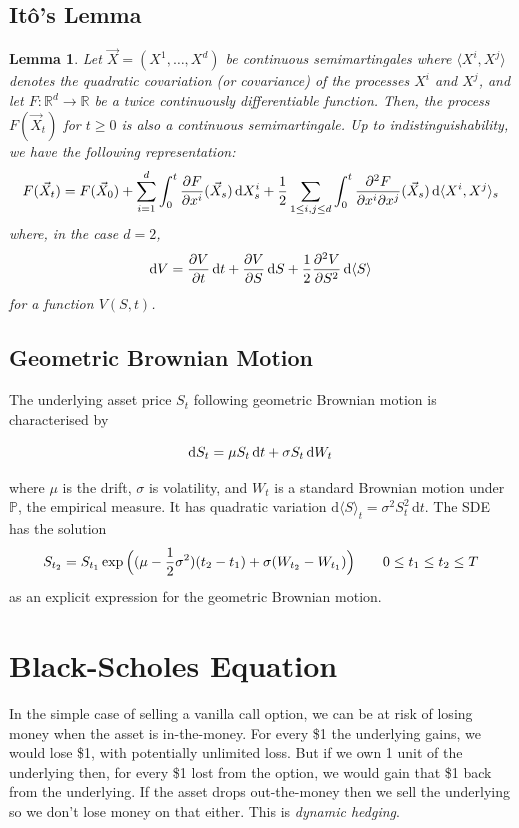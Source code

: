 \documentclass[12pt]{article}
\newtheorem{lemma}{Lemma}[section]
\theoremstyle{definition}
\theoremstyle{remark}
\begin{document}
\subsection{It\^o's Lemma}
\begin{lemma}
	Let $\vec{X} = (X^1, \dots, X^d)$ be continuous semimartingales where $\langle X^i, X^j \rangle$ denotes the quadratic covariation (or covariance) of the processes $X^i$ and $X^j$, and let $F : \mathbb{R}^d \to \mathbb{R}$ be a twice continuously differentiable function. Then, the process $F(\vec{X}_t)$ for $t\geq 0$ is also a continuous semimartingale. Up to indistinguishability, we have the following representation:
	$$
	\vphantom{\int} F(\vec{X}_t) = F(\vec{X}_0) + \sum_{i=1}^{d} \int_0^t \frac{\partial F}{\partial x^i}(\vec{X}_s) \, \mathrm{d}X^i_s + \frac{1}{2} \sum_{1 \leq i,j \leq d} \int_0^t \frac{\partial^2 F}{\partial x^i \partial x^j}(\vec{X}_s) \, \mathrm{d}\langle X^i, X^j \rangle_s
	$$
	where, in the case $d=2$,
	$$
	\vphantom{\int} \mathrm{d}V = \frac{\partial V}{\partial t} \, \mathrm{d}t + \frac{\partial V}{\partial S} \, \mathrm{d}S + \frac{1}{2} \frac{\partial^2 V}{\partial S^2} \, \mathrm{d}\langle S \rangle
	$$
	for a function $V(S,t)$.
\end{lemma}


\subsection{Geometric Brownian Motion}
The underlying asset price $S_t$ following geometric Brownian motion is characterised by
$$
\vphantom{\int} \mathrm{d}S_t = \mu S_t \,\mathrm{d}t + \sigma S_t\, \mathrm{d}W_t
$$
where $\mu$ is the drift, $\sigma$ is volatility, and $W_t$ is a standard Brownian motion under $\mathbb{P}$, the empirical measure. It has quadratic variation $\mathrm{d} \langle S \rangle_t = \sigma^2 S_t^2\, \mathrm{d}t$. The SDE has the solution
$$
\vphantom{\int} S_{t_2} = S_{t_1} \exp \Big( (\mu - \frac{1}{2} \sigma^2)(t_2-t_1) + \sigma (W_{t_2} - W_{t_1}) \Big) \quad\quad 0\leq t_1 \leq t_2 \leq T
$$
as an explicit expression for the geometric Brownian motion.



\section{Black-Scholes Equation}
In the simple case of selling a vanilla call option, we can be at risk of losing money when the asset is in-the-money. For every \$1 the underlying gains, we would lose \$1, with potentially unlimited loss. But if we own 1 unit of the underlying then, for every \$1 lost from the option, we would gain that \$1 back from the underlying. If the asset drops out-the-money then we sell the underlying so we don't lose money on that either. This is {\emph{dynamic hedging}}.
\end{document}
